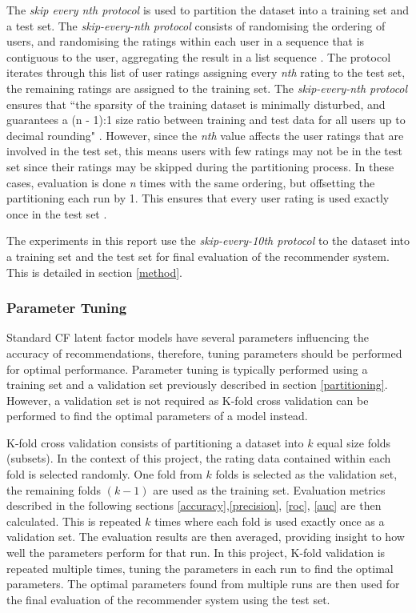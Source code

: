 The \textit{skip every nth protocol} \cite{zhang} is used to partition the dataset into a training set and a test set. The \textit{skip-every-nth protocol} consists of randomising the ordering of users, and randomising the ratings within each user in a sequence that is contiguous to the user, aggregating the result in a list sequence \cite{zhang}. The protocol iterates through this list of user ratings assigning every \textit{nth} rating to the test set, the remaining ratings are assigned to the training set. The \textit{skip-every-nth protocol} ensures that ``the sparsity of the training dataset is minimally disturbed, and guarantees a (n - 1):1 size ratio between training and test data for all users up to decimal rounding" \cite{zhang}. However, since the \textit{nth} value affects the user ratings that are involved in the test set, this means users with few ratings may not be in the test set since their ratings may be skipped during the partitioning process. In these cases, evaluation is done \textit{n} times with the same ordering, but offsetting the partitioning each run by 1. This ensures that every user rating is used exactly once in the test set \cite{zhang}. 

The experiments in this report use the \textit{skip-every-10th protocol} to the dataset into a training set and the test set for final evaluation of the recommender system. This is detailed in section \ref{method}.

\subsubsection{Parameter Tuning}

Standard CF latent factor models have several parameters influencing the accuracy of recommendations, therefore, tuning parameters should be performed for optimal performance. Parameter tuning is typically performed using a training set and a validation set previously described in section \ref{partitioning}. However, a validation set is not required as K-fold cross validation can be performed to find the optimal parameters of a model instead. 

K-fold cross validation \cite{kfold, campochiaro2009metrics} consists of partitioning a dataset into $k$ equal size folds (subsets). In the context of this project, the rating data contained within each fold is selected randomly. One fold from $k$ folds is selected as the validation set, the remaining folds $(k-1)$ are used as the training set. Evaluation metrics described in the following sections \ref{accuracy},\ref{precision}, \ref{roc}, \ref{auc} are then calculated. This is repeated $k$ times where each fold is used exactly once as a validation set. The evaluation results are then averaged, providing insight to how well the parameters perform for that run. In this project, K-fold validation is repeated multiple times, tuning the parameters in each run to find the optimal parameters. The optimal parameters found from multiple runs are then used for the final evaluation of the recommender system using the test set.

